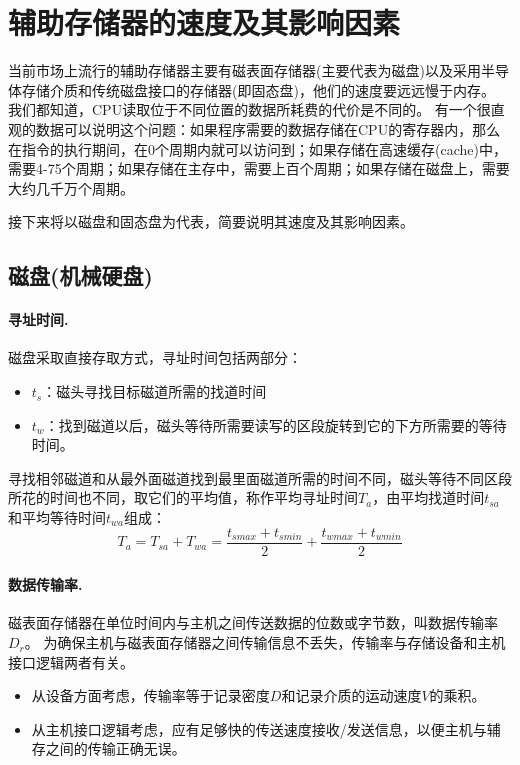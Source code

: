 \documentclass[final]{cvpr}
\newcommand{\mypara}[1]{\paragraph{#1.}}
\begin{document}
\section{辅助存储器的速度及其影响因素}\label{sec:DISK}

当前市场上流行的辅助存储器主要有磁表面存储器(主要代表为磁盘)以及采用半导体存储介质和传统磁盘接口的存储器(即固态盘)，他们的速度要远远慢于内存。
我们都知道，CPU读取位于不同位置的数据所耗费的代价是不同的。
有一个很直观的数据可以说明这个问题：如果程序需要的数据存储在CPU的寄存器内，那么在指令的执行期间，在0个周期内就可以访问到；如果存储在高速缓存(cache)中，需要4-75个周期；如果存储在主存中，需要上百个周期；如果存储在磁盘上，需要大约几千万个周期\cite{CSAPP}。

接下来将以磁盘和固态盘为代表，简要说明其速度及其影响因素。


\subsection{\textbf{磁盘(机械硬盘)}}

\mypara{寻址时间}

磁盘采取直接存取方式，寻址时间包括两部分：
\begin{itemize}
    \item $t_s$：磁头寻找目标磁道所需的找道时间
    \item $t_w$：找到磁道以后，磁头等待所需要读写的区段旋转到它的下方所需要的等待时间。
\end{itemize}

寻找相邻磁道和从最外面磁道找到最里面磁道所需的时间不同，磁头等待不同区段所花的时间也不同，取它们的平均值，称作平均寻址时间$T_a$，由平均找道时间$t_{sa}$和平均等待时间$t_{wa}$组成：
$$
	T_a=T_{sa}+T_{wa}=\frac{t_{smax}+t_{smin}}{2}+\frac{t_{wmax}+t_{wmin}}{2}
$$

\mypara{数据传输率}

磁表面存储器在单位时间内与主机之间传送数据的位数或字节数，叫数据传输率$D_r$。
为确保主机与磁表面存储器之间传输信息不丢失，传输率与存储设备和主机接口逻辑两者有关。
\begin{itemize}
    \item 从设备方面考虑，传输率等于记录密度$D$和记录介质的运动速度$V$的乘积。
    \item 从主机接口逻辑考虑，应有足够快的传送速度接收/发送信息，以便主机与辅存之间的传输正确无误。
\end{itemize}
\end{document}
